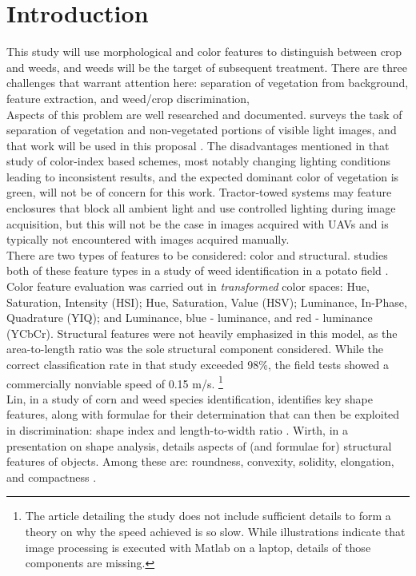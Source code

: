 \documentclass[12pt]{article}
\begin{document}
\section{Introduction}
This study will use morphological and color features to distinguish between crop and weeds, and weeds will be the target of subsequent treatment. There are three challenges that warrant attention here: separation of vegetation from background, feature extraction, and weed/crop discrimination,\\
Aspects of this problem are well researched and documented. \citeauthor{Hamuda2016-dw} surveys the task of separation of vegetation and non-vegetated portions of visible light images, and that work will be used in this proposal \parencite{Hamuda2016-dw}. The disadvantages mentioned in that study of color-index based schemes, most notably changing lighting conditions leading to inconsistent results, and the expected dominant color of vegetation is green, will not be of concern for this work. Tractor-towed systems may feature enclosures that block all ambient light and use controlled lighting during image acquisition, but this will not be the case in images acquired with UAVs and is typically not encountered with images acquired manually.\\
There are two types of features to be considered: color and structural. \citeauthor{Sabzi2020-af} studies both of these feature types in a study of weed identification in a potato field \parencite{Sabzi2020-af}. Color feature evaluation was carried out in \textit{transformed} color spaces: Hue, Saturation, Intensity (HSI); Hue, Saturation, Value (HSV); Luminance, In-Phase, Quadrature (YIQ); and Luminance, blue - luminance, and red - luminance (YCbCr). Structural features were not heavily emphasized in this model, as the area-to-length ratio was the sole structural component considered. While the correct classification rate in that study exceeded 98\%, the field tests showed a commercially nonviable speed of 0.15 m/s. \footnote{The article detailing the study does not include sufficient details to form a theory on why the speed achieved is so slow. While illustrations indicate that image processing is executed with Matlab on a laptop, details of those components are missing.} \\
Lin, in a study of corn and weed species identification, identifies key shape features, along with formulae for their determination that can then be exploited in discrimination: shape index and length-to-width ratio \parencite{Lin2017-xq}. Wirth, in a presentation on shape analysis, details aspects of (and formulae for) structural features of objects. Among these are: roundness, convexity, solidity, elongation, and compactness \parencite{Wirth2004-li}.\\
\end{document}
